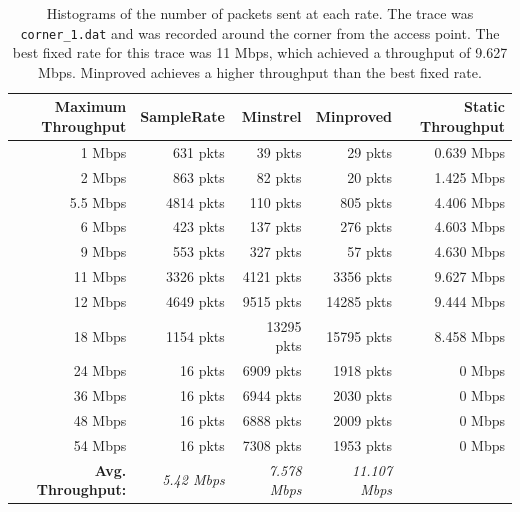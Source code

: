 \documentclass[twocolumn,10pt]{article}
\begin{document}
\begin{table}[htb]
    \centering
    \begin{tabular}{r|rrr|r}

    \textbf{Maximum Throughput} & \textbf{SampleRate} &
    \textbf{Minstrel} & \textbf{Minproved} &
    \textbf{Static Throughput}\\ \hline

    1   Mbps & 631  pkts & 39    pkts & 29    pkts & 0.639 Mbps \\
    2   Mbps & 863  pkts & 82    pkts & 20    pkts & 1.425 Mbps \\
    5.5 Mbps & 4814 pkts & 110   pkts & 805   pkts & 4.406 Mbps \\
    6   Mbps & 423  pkts & 137   pkts & 276   pkts & 4.603 Mbps \\
    9   Mbps & 553  pkts & 327   pkts & 57    pkts & 4.630 Mbps \\
    11  Mbps & 3326 pkts & 4121  pkts & 3356  pkts & 9.627 Mbps \\
    12  Mbps & 4649 pkts & 9515  pkts & 14285 pkts & 9.444 Mbps \\
    18  Mbps & 1154 pkts & 13295 pkts & 15795 pkts & 8.458 Mbps \\
    24  Mbps & 16   pkts & 6909  pkts & 1918  pkts & 0 Mbps \\
    36  Mbps & 16   pkts & 6944  pkts & 2030  pkts & 0 Mbps \\
    48  Mbps & 16   pkts & 6888  pkts & 2009  pkts & 0 Mbps \\
    54  Mbps & 16   pkts & 7308  pkts & 1953  pkts & 0 Mbps \\ \hline

    \textbf{Avg. Throughput:} & \emph{5.42 Mbps}  & \emph{7.578 Mbps} & \emph{11.107 Mbps} \\
    \end{tabular}
    \caption{Histograms of the number of packets sent at each rate.
      The trace was \texttt{corner\_1.dat} and was recorded around the
      corner from the access point.  The best fixed rate for this
      trace was 11 Mbps, which achieved a throughput of 9.627 Mbps.
      Minproved achieves a higher throughput than the best fixed
      rate.}

    \label{table:2}
\end{table}
\end{document}
